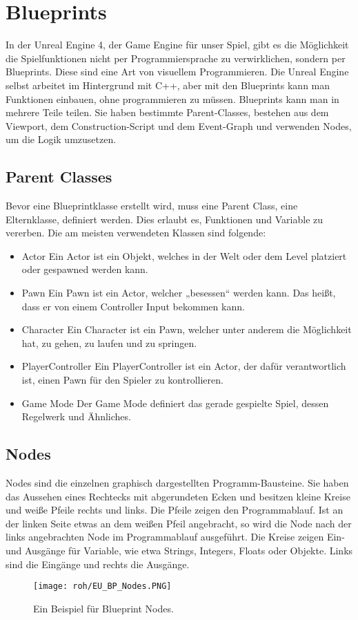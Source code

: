 \section{Blueprints}
In der Unreal Engine 4, der Game Engine für unser Spiel, gibt es die Möglichkeit die Spielfunktionen nicht per Programmiersprache zu verwirklichen, sondern per Blueprints.
Diese sind eine Art von visuellem Programmieren. \citep{ue:BPs}
Die Unreal Engine selbst arbeitet im Hintergrund mit C++, aber mit den Blueprints kann man Funktionen einbauen, ohne programmieren zu müssen. \citep{ue:programming}
Blueprints kann man in mehrere Teile teilen.
Sie haben bestimmte Parent-Classes, bestehen aus dem Viewport, dem Construction-Script und dem Event-Graph und verwenden Nodes, um die Logik umzusetzen. \citep{ue:BPoverview}
\subsection{Parent Classes}
Bevor eine Blueprintklasse erstellt wird, muss eine Parent Class, eine Elternklasse, definiert werden.
Dies erlaubt es, Funktionen und Variable zu vererben.\citep{ue:BPParents}
Die am meisten verwendeten Klassen sind folgende:
\begin{itemize}
    \item Actor \citep{ue:BPActors}
    Ein Actor ist ein Objekt, welches in der Welt oder dem Level platziert oder gespawned werden kann.
    \item Pawn \citep{ue:BPPawn}
    Ein Pawn ist ein Actor, welcher „besessen“ werden kann.
    Das heißt, dass er von einem Controller Input bekommen kann.
    \item Character \citep{ue:BPCharacter}
    Ein Character ist ein Pawn, welcher unter anderem die Möglichkeit hat, zu gehen, zu laufen und zu springen.
    \item PlayerController \citep{ue:BPPlayerController}
    Ein PlayerController ist ein Actor, der dafür verantwortlich ist, einen Pawn für den Spieler zu kontrollieren.
    \item Game Mode \citep{ue:BPGameMode}
    Der Game Mode definiert das gerade gespielte Spiel, dessen Regelwerk und Ähnliches.
\end{itemize}
\subsection{Nodes}
Nodes sind die einzelnen graphisch dargestellten Programm-Bausteine.\citep{ue:node_introduction}
Sie haben das Aussehen eines Rechtecks mit abgerundeten Ecken und besitzen kleine Kreise und weiße Pfeile rechts und links.
Die Pfeile zeigen den Programmablauf.
Ist an der linken Seite etwas an dem weißen Pfeil angebracht, so wird die Node nach der links angebrachten Node im Programmablauf ausgeführt.
Die Kreise zeigen Ein- und Ausgänge für Variable, wie etwa Strings, Integers, Floats oder Objekte.
Links sind die Eingänge und rechts die Ausgänge.
\raggedbottom
\begin{figure}[H]
    \centering
    \texttt{[image: roh/EU\_BP\_Nodes.PNG]}
    \caption{Ein Beispiel für Blueprint Nodes.}
    \label{UE:BP_Nodes}
\end{figure}
